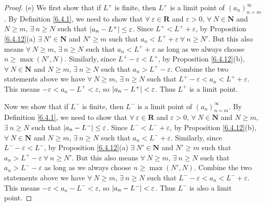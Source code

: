 \begin{proof}{(e)}
    We first show that if \(L^+\) is finite, then \(L^+\) is a limit point of \((a_n)_{n = m}^\infty\).
    By Definition \ref{6.4.1}, we need to show that \(\forall\ \varepsilon \in \mathbf{R}\) and \(\varepsilon > 0\), \(\forall\ N \in \mathbf{N}\) and \(N \geq m\), \(\exists\ n \geq N\) such that \(\abs*{a_n - L^+} \leq \varepsilon\).
    Since \(L^+ < L^+ + \varepsilon\), by Proposition \ref{6.4.12}(a) \(\exists\ N' \in \mathbf{N}\) and \(N' \geq m\) such that \(a_n < L^+ + \varepsilon \ \forall\ n \geq N'\).
    But this also means \(\forall\ N \geq m\), \(\exists\ n \geq N\) such that \(a_n < L^+ + \varepsilon\) as long as we always choose \(n \geq \max(N', N)\).
    Similarly, since \(L^+ - \varepsilon < L^+\), by Proposition \ref{6.4.12}(b), \(\forall\ N \in \mathbf{N}\) and \(N \geq m\), \(\exists\ n \geq N\) such that \(a_n > L^+ - \varepsilon\).
    Combine the two statements above we have \(\forall\ N \geq m\), \(\exists\ n \geq N\) such that \(L^+ - \varepsilon < a_n < L^+ + \varepsilon\).
    This means \(-\varepsilon < a_n - L^+ < \varepsilon\), so \(\abs*{a_n - L^+} < \varepsilon\).
    Thus \(L^+\) is a limit point.

    Now we show that if \(L^-\) is finite, then \(L^-\) is a limit point of \((a_n)_{n = m}^\infty\).
    By Definition \ref{6.4.1}, we need to show that \(\forall\ \varepsilon \in \mathbf{R}\) and \(\varepsilon > 0\), \(\forall\ N \in \mathbf{N}\) and \(N \geq m\), \(\exists\ n \geq N\) such that \(\abs*{a_n - L^-} \leq \varepsilon\).
    Since \(L^- < L^- + \varepsilon\), by Proposition \ref{6.4.12}(b), \(\forall\ N \in \mathbf{N}\) and \(N \geq m\), \(\exists\ n \geq N\) such that \(a_n < L^- + \varepsilon\).
    Similarly, since \(L^- - \varepsilon < L^-\), by Proposition \ref{6.4.12}(a) \(\exists\ N' \in \mathbf{N}\) and \(N' \geq m\) such that \(a_n > L^+ - \varepsilon \ \forall\ n \geq N'\).
    But this also means \(\forall\ N \geq m\), \(\exists\ n \geq N\) such that \(a_n > L^- - \varepsilon\) as long as we always choose \(n \geq \max(N', N)\).
    Combine the two statements above we have \(\forall\ N \geq m\), \(\exists\ n \geq N\) such that \(L^- - \varepsilon < a_n < L^- + \varepsilon\).
    This means \(-\varepsilon < a_n - L^- < \varepsilon\), so \(\abs*{a_n - L^-} < \varepsilon\).
    Thus \(L^-\) is also a limit point.
\end{proof}

